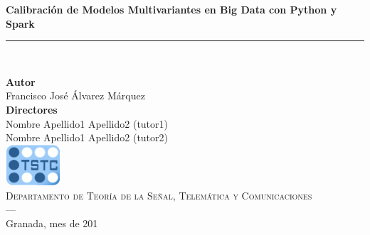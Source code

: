 \begin{titlepage}
 
 
\setlength{\centeroffset}{-0.5\oddsidemargin}
\addtolength{\centeroffset}{0.5\evensidemargin}
\thispagestyle{empty}

\noindent\hspace*{\centeroffset}\begin{minipage}{\textwidth}

\centering

% 

 \vspace{3.3cm}





{\Huge\bfseries  Calibración de Modelos Multivariantes en Big Data con Python y Spark\\
}
\noindent\rule[-1ex]{\textwidth}{3pt}\\[3.5ex]

\end{minipage}

\vspace{2cm}
\noindent\hspace*{\centeroffset}\begin{minipage}{\textwidth}
\centering

\textbf{Autor}\\ {Francisco José Álvarez Márquez}\\[2.5ex]
\textbf{Directores}\\
{Nombre Apellido1 Apellido2 (tutor1)\\
Nombre Apellido1 Apellido2 (tutor2)}\\[2cm]
\includegraphics[width=0.15\textwidth]{imagenes/tstc.png}\\[0.1cm]
\textsc{Departamento de Teoría de la Señal, Telemática y Comunicaciones}\\
\textsc{---}\\
Granada, mes de 201
\end{minipage}

 
\end{titlepage}



